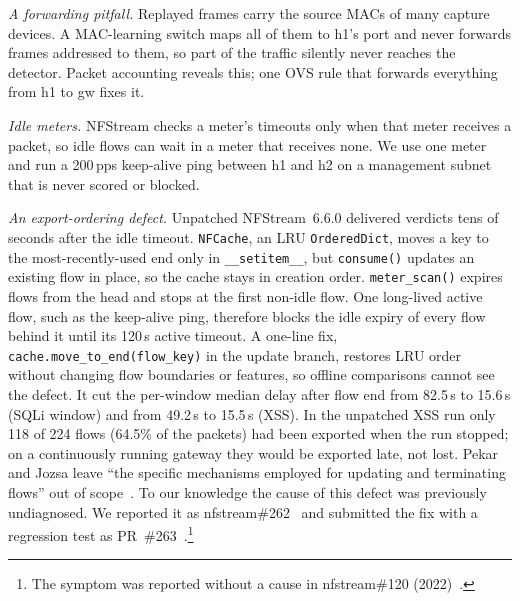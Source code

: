 \emph{A forwarding pitfall.} Replayed frames carry the source MACs of many capture devices. A MAC-learning switch maps all of them to h1's port and never forwards frames addressed to them, so part of the traffic silently never reaches the detector. Packet accounting reveals this; one OVS rule that forwards everything from h1 to gw fixes it.

\emph{Idle meters.} NFStream checks a meter's timeouts only when that meter receives a packet, so idle flows can wait in a meter that receives none. We use one meter and run a 200\,pps keep-alive ping between h1 and h2 on a management subnet that is never scored or blocked.

\emph{An export-ordering defect.} Unpatched NFStream~6.6.0 delivered verdicts tens of seconds after the idle timeout. \texttt{NFCache}, an LRU \texttt{OrderedDict}, moves a key to the most-recently-used end only in \texttt{\_\_setitem\_\_}, but \texttt{consume()} updates an existing flow in place, so the cache stays in creation order. \texttt{meter\_scan()} expires flows from the head and stops at the first non-idle flow. One long-lived active flow, such as the keep-alive ping, therefore blocks the idle expiry of every flow behind it until its 120\,s active timeout. A one-line fix, \texttt{cache.move\_to\_end(flow\_key)} in the update branch, restores LRU order without changing flow boundaries or features, so offline comparisons cannot see the defect. It cut the per-window median delay after flow end from 82.5\,s to 15.6\,s (SQLi window) and from 49.2\,s to 15.5\,s (XSS). In the unpatched XSS run only 118 of 224 flows (64.5\% of the packets) had been exported when the run stopped; on a continuously running gateway they would be exported late, not lost. Pekar and Jozsa leave ``the specific mechanisms employed for updating and terminating flows'' out of scope~\cite{pekar2024integrity}. To our knowledge the cause of this defect was previously undiagnosed. We reported it as nfstream\#262~\cite{nfstream262} and submitted the fix with a regression test as PR~\#263~\cite{nfstream263}.\footnote{The symptom was reported without a cause in nfstream\#120 (2022)~\cite{nfstream120}.}

